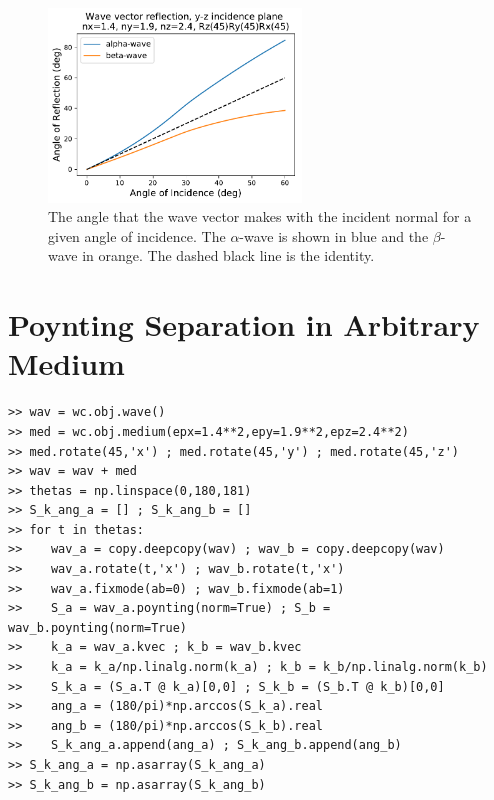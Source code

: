 \documentclass[11pt, reqno]{book}%
\newcounter{ct}
\begin{document}
\begin{figure}[!htb]
  \begin{centering}
    \includegraphics[width=0.6\textwidth]{test_plots/arbitrary_reflection_example.pdf}
        \caption{The angle that the wave vector makes with the incident normal for a given angle of incidence. The $\alpha$-wave is shown in blue and the $\beta$-wave in orange. The dashed black line is the identity.} \label{fig:arbREFL}
      \end{centering}
\end{figure}







\section{Poynting Separation in Arbitrary Medium}
\label{sec:arbitraryPOYNTING}

\begin{verbatim}
>> wav = wc.obj.wave()
>> med = wc.obj.medium(epx=1.4**2,epy=1.9**2,epz=2.4**2)
>> med.rotate(45,'x') ; med.rotate(45,'y') ; med.rotate(45,'z')
>> wav = wav + med
>> thetas = np.linspace(0,180,181)
>> S_k_ang_a = [] ; S_k_ang_b = []
>> for t in thetas:
>>    wav_a = copy.deepcopy(wav) ; wav_b = copy.deepcopy(wav)
>>    wav_a.rotate(t,'x') ; wav_b.rotate(t,'x')
>>    wav_a.fixmode(ab=0) ; wav_b.fixmode(ab=1)
>>    S_a = wav_a.poynting(norm=True) ; S_b = wav_b.poynting(norm=True)
>>    k_a = wav_a.kvec ; k_b = wav_b.kvec
>>    k_a = k_a/np.linalg.norm(k_a) ; k_b = k_b/np.linalg.norm(k_b)
>>    S_k_a = (S_a.T @ k_a)[0,0] ; S_k_b = (S_b.T @ k_b)[0,0]
>>    ang_a = (180/pi)*np.arccos(S_k_a).real 
>>    ang_b = (180/pi)*np.arccos(S_k_b).real
>>    S_k_ang_a.append(ang_a) ; S_k_ang_b.append(ang_b)
>> S_k_ang_a = np.asarray(S_k_ang_a)
>> S_k_ang_b = np.asarray(S_k_ang_b)
\end{verbatim}
\end{document}

